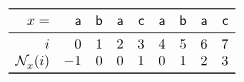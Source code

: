 \documentclass[11pt]{article}
\begin{document}
\TeXtoEPS
\(
\begin{array}{rrrrrrrrr}
\toprule
  x = & \word{a} & \word{b} & \word{a} & \word{c}
      & \word{a} & \word{b} & \word{a} & \word{c}\\
\midrule
  i &  0 & 1 & 2 & 3 & 4 & 5 & 6 & 7\\
  \MPfailure{x}{}{i}
    & -1 & 0 & 0 & 1 & 0 & 1 & 2 & 3\\
\bottomrule
\end{array}
\)
\endTeXtoEPS
\end{document}
